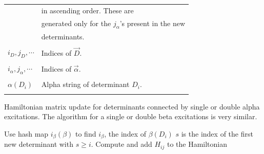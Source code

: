 \documentclass[%
reprint,
 superscriptaddress,
 amsmath,amssymb,
 aps,
]{revtex4-1}
\def\vecD{\vec{D}}
\def\veca{\vec{\alpha}}
\def\vecb{\vec{\beta}}
\def\ia{i_\alpha}
\def\ib{i_\beta}
\def\veciDa{\vec{i}_{D\alpha}}
\begin{document}
\begin{table}[h]
\begin{tabular}{ll}
& in ascending order. These are \\
& generated only for the $j_\alpha$'s present in the new \\
& determinants.\\
&\\
$i_D, j_D, \cdots$ & Indices of $\vecD$.\\
&\\
$\ia, j_\alpha, \cdots$ & Indices of $\veca$.\\
&\\
$\alpha(D_i)$ & Alpha string of determinant $D_i$.\\
&\\
\hline
\end{tabular}
\label{auxiliary}
\end{table}


\begin{algorithm}
\caption{Hamiltonian matrix update for determinants connected by single or double alpha excitations.
The algorithm for a single or double beta excitations is very similar.
}
\begin{algorithmic}
\FOR{$D_i$ in $\vecD$}
  \State Use hash map $\ib(\beta)$ to find $\ib$, the index of $\beta(D_i)$
  \State $s$ is the index of the first new determinant with $s \ge i$.
  \FOR{$j$ in $\veciDa(\ib)$}
    \State Compute and add $H_{ij}$ to the Hamiltonian
  \ENDIF
  \ENDFOR
\ENDFOR
\end{algorithmic}
\label{same_spin}
\vskip 7mm
\end{algorithm}
\end{document}
